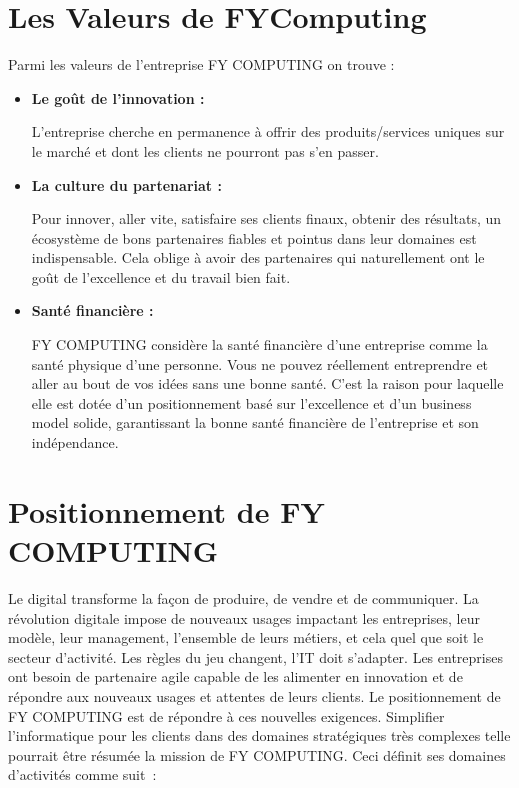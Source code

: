 \documentclass[a4paper,11pt,oneside]{report}
\begin{document}
\section{Les Valeurs de FYComputing}
Parmi les valeurs de l’entreprise FY COMPUTING on trouve : 

\begin{itemize}
\item \textbf{Le goût de l’innovation :}

L’entreprise cherche en permanence à offrir des produits/services uniques sur le marché et dont les clients ne pourront pas s’en passer.

\item \textbf{La culture du partenariat :}

Pour innover, aller vite, satisfaire ses clients finaux, obtenir des résultats, un écosystème de bons partenaires fiables et pointus dans leur domaines est indispensable. Cela oblige à avoir des partenaires qui naturellement ont le goût de l’excellence et du travail bien fait.

\item \textbf{Santé financière :}

FY COMPUTING considère la santé financière d’une entreprise comme la santé physique d’une personne. Vous ne pouvez réellement entreprendre et aller au bout de vos idées sans une bonne santé. C’est la raison pour laquelle elle est dotée d’un positionnement basé sur l’excellence et d’un business model solide, garantissant la bonne santé financière de l’entreprise et son indépendance.
\end{itemize}


\section{Positionnement de FY COMPUTING}
Le digital transforme la façon de produire, de vendre et de communiquer. La révolution digitale impose de nouveaux usages impactant les entreprises, leur modèle, leur management, l’ensemble de leurs métiers, et cela quel que soit le secteur d’activité. Les règles du jeu changent, l’IT doit s’adapter. Les entreprises ont besoin de partenaire agile capable de les alimenter en innovation et de répondre aux nouveaux usages et attentes de leurs clients. Le positionnement de FY COMPUTING est de répondre à ces nouvelles exigences.
\newline
\newline
Simplifier l’informatique pour les clients dans des domaines stratégiques très complexes telle pourrait être résumée la mission de FY COMPUTING. Ceci définit ses domaines d’activités comme suit :
\end{document}
